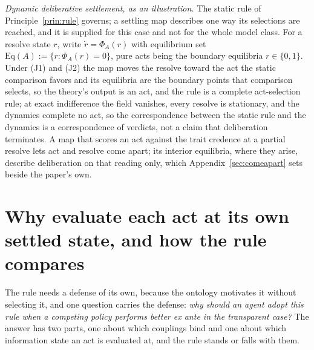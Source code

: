 \noindent\emph{Dynamic deliberative settlement, as an illustration.} The static rule of Principle~\ref{prin:rule} governs; a settling map describes one way its selections are reached, and it is supplied for this case and not for the whole model class. For a resolve state $r$, write $\dot r = \Phi_A(r)$ with equilibrium set $\mathrm{Eq}(A) := \{r : \Phi_A(r) = 0\}$, pure acts being the boundary equilibria $r \in \{0, 1\}$. Under (J1) and (J2) the map moves the resolve toward the act the static comparison favors and its equilibria are the boundary points that comparison selects, so the theory's output is an act, and the rule is a complete act-selection rule; at exact indifference the field vanishes, every resolve is stationary, and the dynamics complete no act, so the correspondence between the static rule and the dynamics is a correspondence of verdicts, not a claim that deliberation terminates. A map that scores an act against the trait credence at a partial resolve lets act and resolve come apart; its interior equilibria, where they arise, describe deliberation on that reading only, which Appendix~\ref{sec:comeapart} sets beside the paper's own.

\section{Why evaluate each act at its own settled state, and how the rule compares}\label{sec:defense}

\noindent The rule needs a defense of its own, because the ontology motivates it without selecting it, and one question carries the defense: \emph{why should an agent adopt this rule when a competing policy performs better ex ante in the transparent case?} The answer has two parts, one about which couplings bind and one about which information state an act is evaluated at, and the rule stands or falls with them.

